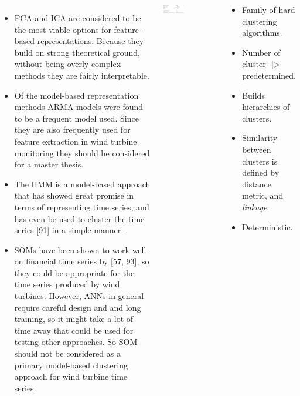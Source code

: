 \documentclass[18pt, a3paper, portrait]{tikzposter}
\begin{document}
\begin{columns}
    {
        \begin{itemize}
            \item PCA and ICA are considered to be the most viable options for feature-based representations. Because they
                build on strong theoretical ground, without being overly complex methods they are fairly interpretable.
            \item Of the model-based representation methods ARMA models were found to be a frequent model
                used. Since they are also frequently used for feature extraction in wind turbine monitoring they should be considered for a master thesis.
            \item The HMM is a model-based approach that has showed great promise in terms of
                representing time series, and has even be used to cluster the time series [91] in a simple manner.
            \item SOMs have been shown to work well on financial time series by [57, 93], so they
                could be appropriate for the time series produced by wind turbines. However, ANNs in general
                require careful design and and long training, so it might take a lot of time away that could be
                used for testing other approaches. So SOM should not be considered as a primary model-based
                clustering approach for wind turbine time series.
        \end{itemize}
    }

    {
        \begin{tikzfigure}
            \includegraphics[width=0.4\textwidth]{images/model_based_rep_meth_table.png}
        \end{tikzfigure}
    }
    \begin{subcolumns}
    {
        \begin{itemize}
            \item Family of hard clustering algorithms.
            \item Number of cluster -|> predetermined.
            \item Builds hierarchies of clusters.
            \item Similarity between clusters is defined by distance metric, and \textit{linkage}.
            \item Deterministic.
        \end{itemize}
    }


\end{subcolumns}
\end{columns}
\end{document}
